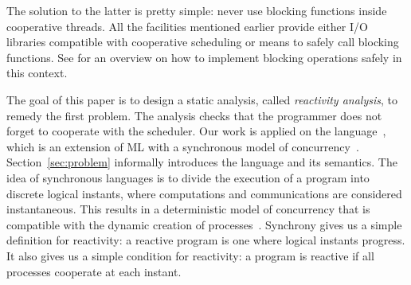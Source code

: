 \documentclass[9pt,preprint]{sigplanconf}
\newcommand{\todo}[1]{ {\color{red} #1}}
\begin{document}

The solution to the latter is pretty simple: never use blocking functions inside cooperative threads. All the facilities mentioned earlier provide either I/O libraries compatible with cooperative scheduling or means to safely call blocking functions. See \cite{Marlow:2004} for an overview on how to implement blocking operations safely in this context.


The goal of this paper is to design a static analysis, called \emph{reactivity analysis}, to remedy the first problem. The analysis checks that the programmer does not forget to cooperate with the scheduler.
%
Our work is applied on the \rml language~\cite{Mandel:2005}, which is an extension of ML with a synchronous model of concurrency~\cite{Benveniste:2003}. Section~\ref{sec:problem} informally introduces the language and its semantics. The idea of synchronous languages is to divide the execution of a program into discrete logical instants, where computations and communications are considered instantaneous. This results in a deterministic model of concurrency that is compatible with the dynamic creation of processes~\cite{Boussinot:1991}.  Synchrony gives us a simple definition for reactivity: a reactive \rml program is one where logical instants progress. It also gives us a simple condition for reactivity: a program is reactive if all processes cooperate at each instant.  %
\end{document}
